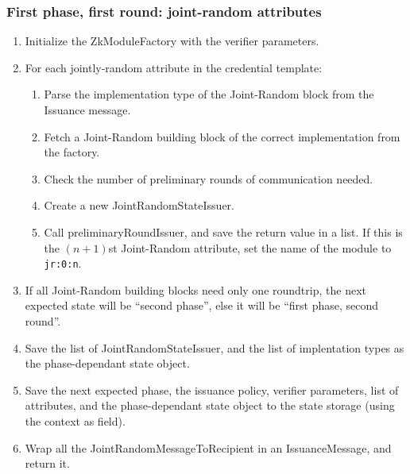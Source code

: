   \subsubsection{First phase, first round: joint-random attributes}
  \notimplemented
  \begin{enumerate}
    \item Initialize the ZkModuleFactory with the verifier parameters.
    \item For each jointly-random attribute in the credential template:
      \begin{enumerate}
        \item Parse the implementation type of the Joint-Random block from the Issuance message.
        \item Fetch a Joint-Random building block of the correct implementation from the factory.
        \item Check the number of preliminary rounds of communication needed.
        \item Create a new JointRandomStateIssuer.
        \item Call preliminaryRoundIssuer, and save the return value in a list. If this is the $(n+1)$st Joint-Random attribute,
          set the name of the module to \texttt{jr:0:n}.
      \end{enumerate}
      \item If all Joint-Random building blocks need only one roundtrip, the next expected state will be ``second phase'', else
        it will be ``first phase, second round''.
      \item Save the list of JointRandomStateIssuer, and the list of implentation types as the phase-dependant state object.
      \item Save the next expected phase, the issuance policy, verifier parameters, list of attributes,
      and the phase-dependant state object to the state storage (using the context as field).
      \item Wrap all the JointRandomMessageToRecipient in an IssuanceMessage, and return it.
  \end{enumerate}

